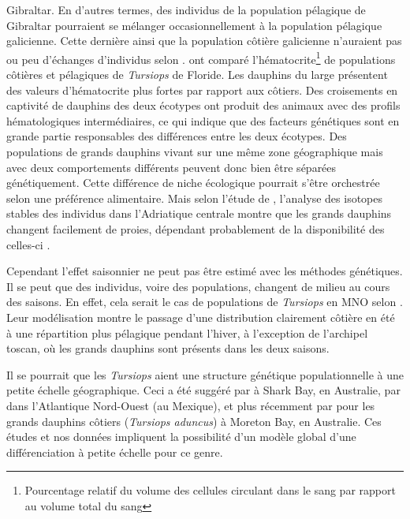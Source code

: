 \documentclass[a4paper,12pt,twoside]{article}\usepackage[]{graphicx}\usepackage[]{color}
\begin{document}
\begin {bibunit} [newbst]
Gibraltar. En d'autres termes, des individus de la population pélagique de Gibraltar pourraient se mélanger occasionnellement à la population pélagique galicienne. Cette dernière ainsi que la population côtière galicienne n'auraient pas ou peu d'échanges d'individus selon \citet{louis2014}. \citet{duffield1983hematology} ont comparé l'hématocrite\footnote{ Pourcentage relatif du volume des cellules circulant dans le sang par rapport au volume total du sang} de populations côtières et pélagiques de \emph{Tursiops} de Floride. Les dauphins du large présentent des valeurs d'hématocrite plus fortes par rapport aux côtiers. Des croisements en captivité de dauphins des deux écotypes ont produit des animaux avec des profils hématologiques intermédiaires, ce qui indique que des facteurs génétiques sont en grande partie responsables des différences entre les deux écotypes. Des populations de grands dauphins vivant sur une même zone géographique mais avec deux comportements différents peuvent donc bien être séparées génétiquement. Cette différence de niche écologique pourrait s'être orchestrée selon une préférence alimentaire. Mais selon l'étude de \citet{gaspari2015population}, l'analyse des isotopes stables des individus dans l'Adriatique centrale montre que les grands dauphins changent facilement de proies, dépendant probablement de la disponibilité des celles-ci \citep{holcer2012ecology}.

Cependant l'effet saisonnier ne peut pas être estimé avec les méthodes génétiques. Il se peut que des individus, voire des populations, changent de milieu au cours des saisons. En effet, cela serait le cas de populations de \emph{Tursiops} en MNO selon \citep{Laran2016}. Leur modélisation montre le passage d'une distribution clairement côtière en été à une répartition plus pélagique pendant l'hiver, à l'exception de l'archipel toscan, où les grands dauphins sont présents dans les deux saisons.

Il se pourrait que les \emph{Tursiops} aient une structure génétique populationnelle à une petite échelle géographique. Ceci a été suggéré par \citet{krutzen2004population} à Shark Bay, en Australie, par \citet{sellas2005mitochondrial} dans l'Atlantique Nord-Ouest (au Mexique), et plus récemment par \citet{ansmann2012dolphins} pour les grands dauphins côtiers (\emph{Tursiops aduncus}) à Moreton Bay, en Australie. Ces études et nos données impliquent la possibilité d'un modèle global d'une différenciation à petite échelle pour ce genre.


\end{bibunit}
\end{document}
